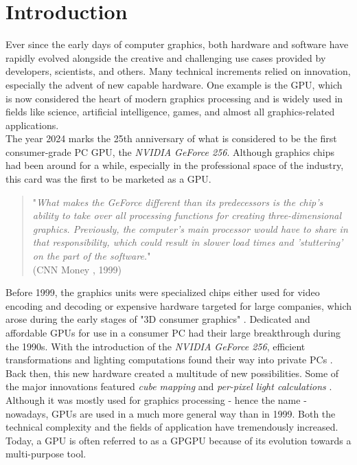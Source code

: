 \chapter{Introduction} \label{cpt-introduction}

Ever since the early days of computer graphics, both hardware and software have rapidly evolved
alongside the creative and challenging use cases provided by developers, scientists, and others.
Many technical increments relied on innovation, especially the advent of new capable hardware.
One example is the \ac{GPU}, which is now considered the heart of modern graphics 
processing and is widely used in fields like science, artificial intelligence, games, and almost  
all graphics-related applications. \\

\noindent
The year 2024 marks the 25th anniversary of what is considered to be the first consumer-grade PC 
\ac{GPU}, the \emph{NVIDIA GeForce 256}. Although graphics chips had been around for a while, 
especially in the professional space of the industry, this card was the first to be marketed 
as a \ac{GPU}. 

\begin{quote}
    "\emph{What makes the GeForce different than its predecessors is the chip's ability to take over all 
    processing functions for creating three-dimensional graphics. Previously, the computer's main 
    processor would have to share in that responsibility, which could result in slower load times 
    and 'stuttering' on the part of the software.}" \\  
    (CNN Money \cite{CNNMoney1999}, 1999)
\end{quote}

\noindent
Before 1999, the graphics units were specialized chips either used for video encoding and decoding
or expensive hardware targeted for large companies, which arose during the early stages of "3D 
consumer graphics" \cite{Singer2023}. Dedicated and affordable \ac{GPU}s for use in a consumer \ac{PC} 
had their large breakthrough during the 1990s. With the introduction of the \emph{NVIDIA GeForce 256}, 
efficient transformations and lighting computations found their way into private \ac{PC}s 
\cite{Fenno2024}. Back then, this new hardware created a multitude of new possibilities. Some of the 
major innovations featured \emph{cube mapping} and \emph{per-pixel light calculations} 
\cite{NVIDIA1999, Battaglia2024}.\\

\noindent
Although it was mostly used for graphics processing - hence the name - nowadays, \ac{GPU}s are used 
in a much more general way than in 1999. Both the technical complexity and the fields of application 
have tremendously increased. Today, a \ac{GPU} is often referred to as a \ac{GPGPU} because of its 
evolution towards a multi-purpose tool. \\

